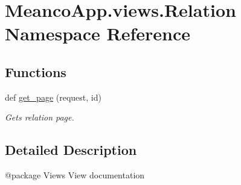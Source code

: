 \hypertarget{namespace_meanco_app_1_1views_1_1_relation}{}\section{Meanco\+App.\+views.\+Relation Namespace Reference}
\label{namespace_meanco_app_1_1views_1_1_relation}
\subsection*{Functions}
\begin{DoxyCompactItemize}
\item 
\hypertarget{namespace_meanco_app_1_1views_1_1_relation_acb46c98b24a178fa104a62fcc60ca7e3}{}\label{namespace_meanco_app_1_1views_1_1_relation_acb46c98b24a178fa104a62fcc60ca7e3} 
def \hyperlink{namespace_meanco_app_1_1views_1_1_relation_acb46c98b24a178fa104a62fcc60ca7e3}{get\+\_\+page} (request, id)
\begin{DoxyCompactList}\small\item\em Gets relation page. \end{DoxyCompactList}\end{DoxyCompactItemize}


\subsection{Detailed Description}
\begin{DoxyVerb}@package Views
View documentation\end{DoxyVerb}
 